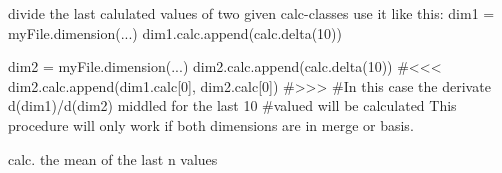 \documentclass[letterpaper,10pt,english]{sphinxmanual}
\begin{document}
\begin{fulllineitems}
\label{methods:diaGrabber.methods.calc.divideCalcClasses}
divide the last calulated values of two given calc-classes
use it like this:
dim1 = myFile.dimension(...)
dim1.calc.append(calc.delta(10))

dim2 = myFile.dimension(...)
dim2.calc.append(calc.delta(10))
\#\textless{}\textless{}\textless{}
dim2.calc.append(dim1.calc{[}0{]}, dim2.calc{[}0{]})
\#\textgreater{}\textgreater{}\textgreater{}
\#In this case the derivate d(dim1)/d(dim2) middled for the last 10
\#valued will be calculated
This procedure will only work if both dimensions are in merge or basis.

\end{fulllineitems}


\begin{fulllineitems}
\label{methods:diaGrabber.methods.calc.mean}
calc. the mean of the last n values

\end{fulllineitems}

\label{methods:module-diaGrabber.methods.merge}

\begin{fulllineitems}
\label{methods:diaGrabber.methods.merge.max}
\end{fulllineitems}


\begin{fulllineitems}
\label{methods:diaGrabber.methods.merge.mean}
\end{fulllineitems}


\begin{fulllineitems}
\label{methods:diaGrabber.methods.merge.min}
\end{fulllineitems}
\end{document}
